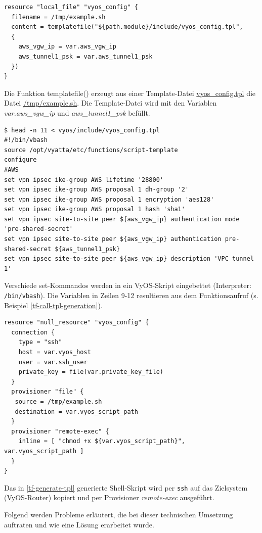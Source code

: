 \begin{listing}[h]
\begin{verbatim}
resource "local_file" "vyos_config" {
  filename = /tmp/example.sh
  content = templatefile("${path.module}/include/vyos_config.tpl",
  {
    aws_vgw_ip = var.aws_vgw_ip
    aws_tunnel1_psk = var.aws_tunnel1_psk
  })
}

\end{verbatim}
\caption{Die Funktion templatefile() erzeugt aus einer Template-Datei \underline{vyos\_config.tpl} die Datei \underline{/tmp/example.sh}. Die Template-Datei wird mit den Variablen \textit{var.aws\_vgw\_ip} und \textit{aws\_tunnel1\_psk} befüllt.}
\label{tf-call-tpl-generation}
\end{listing}\FloatBarrier
\begin{listing}[h]
\begin{verbatim}
$ head -n 11 < vyos/include/vyos_config.tpl
#!/bin/vbash
source /opt/vyatta/etc/functions/script-template
configure
#AWS
set vpn ipsec ike-group AWS lifetime '28800'
set vpn ipsec ike-group AWS proposal 1 dh-group '2'
set vpn ipsec ike-group AWS proposal 1 encryption 'aes128'
set vpn ipsec ike-group AWS proposal 1 hash 'sha1'
set vpn ipsec site-to-site peer ${aws_vgw_ip} authentication mode 'pre-shared-secret'
set vpn ipsec site-to-site peer ${aws_vgw_ip} authentication pre-shared-secret ${aws_tunnel1_psk}
set vpn ipsec site-to-site peer ${aws_vgw_ip} description 'VPC tunnel 1'

\end{verbatim}
\caption{Verschiede set-Kommandos werden in ein VyOS-Skript eingebettet (Interpreter: \texttt{/bin/vbash}). Die Variablen in Zeilen 9-12 resultieren aus dem Funktionsaufruf (s. Beispiel \ref{tf-call-tpl-generation}).}
\label{tf-generate-tpl}
\end{listing}\FloatBarrier
\begin{listing}[h]
\begin{verbatim}
resource "null_resource" "vyos_config" {
  connection {
    type = "ssh"
    host = var.vyos_host
    user = var.ssh_user
    private_key = file(var.private_key_file)
  }
  provisioner "file" {
   source = /tmp/example.sh
   destination = var.vyos_script_path
  }
  provisioner "remote-exec" {
    inline = [ "chmod +x ${var.vyos_script_path}", var.vyos_script_path ]
  }
}
\end{verbatim}
\caption{Das in \ref{tf-generate-tpl} generierte Shell-Skript wird per \texttt{ssh} auf das Zielsystem (VyOS-Router) kopiert und per Provisioner \textit{remote-exec} ausgeführt.}
\label{tf-copy-tpl}
\end{listing}\FloatBarrier
Folgend werden Probleme erläutert, die bei dieser technischen Umsetzung auftraten und wie eine Lösung erarbeitet wurde.
\newpage
